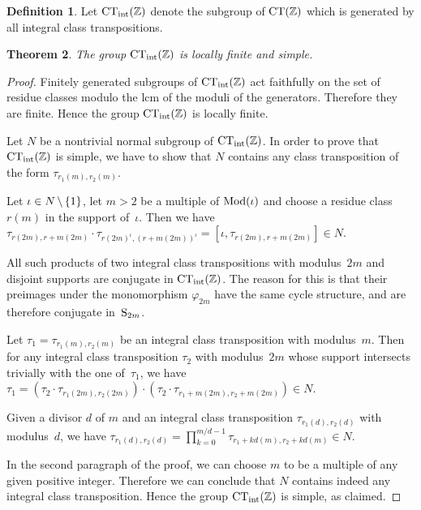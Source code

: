 \documentclass{amsart}
\theoremstyle{definition} \newtheorem{CTZDefinition}{Definition}[section]
\theoremstyle{plain}      \newtheorem{CTZPropertiesTheorem}[CTZDefinition]{Theorem}
\theoremstyle{plain}      \newtheorem{CTZSubgroupsTheorem}[CTZDefinition]{Theorem}
\theoremstyle{definition} \newtheorem{RcwaMappingDefinition}{Definition}[section]
\theoremstyle{definition} \newtheorem{RCWADefinition}[RcwaMappingDefinition]{Definition}
\theoremstyle{plain}      \newtheorem{CTZNotFinitelyGeneratedTheorem}
\theoremstyle{definition} \newtheorem{CTZSmEmbeddingDefinition}[RcwaMappingDefinition]{Definition}
\theoremstyle{plain}      \newtheorem{CTZHighlyTransitiveTheorem}[RcwaMappingDefinition]{Theorem}
\theoremstyle{plain}      \newtheorem{CTZTorsionElementsDivisibleTheorem}
\theoremstyle{plain}      \newtheorem{CTLemma}{Lemma}[section]
\theoremstyle{plain}      \newtheorem{IntegralCommutatorLemma}[CTLemma]{Lemma}
\theoremstyle{plain}      \newtheorem{NormalSubgroupContainsIntegralElementLemma}[CTLemma]{Lemma}
\theoremstyle{plain}      \newtheorem{CTZSimpleTheorem}[CTLemma]{Theorem}
\theoremstyle{remark}     \newtheorem{CTZSimpleRemark}[CTLemma]{Remark}
\theoremstyle{definition} \newtheorem{CTPZDefinition}[CTLemma]{Definition}
\theoremstyle{plain}      \newtheorem{CTPZSimpleCorollary}[CTLemma]{Corollary}
\theoremstyle{plain}      \newtheorem{CTPZSimpleProblem}[CTLemma]{Problem}
\theoremstyle{plain}      \newtheorem{FnPSL2ZEmbeddingTheorem}{Theorem}[section]
\theoremstyle{plain}      \newtheorem{FreeProductEmbeddingTheorem}[FnPSL2ZEmbeddingTheorem]{Theorem}
\theoremstyle{definition} \newtheorem{RestrictionMonomorphismDefinition}
\theoremstyle{plain}      \newtheorem{DirectAndWreathProductsEmbeddingTheorem}
\theoremstyle{plain}      \newtheorem{DirectAndWreathProductsEmbeddingCorollary}
\theoremstyle{definition} \newtheorem{CTintZDefinition}[FnPSL2ZEmbeddingTheorem]{Definition}
\theoremstyle{plain}      \newtheorem{CTintZSimpleTheorem}[FnPSL2ZEmbeddingTheorem]{Theorem}
\theoremstyle{definition} \newtheorem{KernelDefinition}{Definition}[section]
\theoremstyle{definition} \newtheorem{TameWildDefinition}[KernelDefinition]{Definition}
\theoremstyle{definition} \newtheorem{SimpleSupergroupsDefinition}[KernelDefinition]{Definition}
\theoremstyle{definition} \newtheorem{CSCRDefinition}[KernelDefinition]{Definition}
\theoremstyle{plain}      \newtheorem{SimpleSupergroupsGeneratorsTheorem}[KernelDefinition]{Theorem}
\theoremstyle{plain}      \newtheorem{SimpleSupergroupsTheorem}[KernelDefinition]{Theorem}
\theoremstyle{plain}      \newtheorem{SimpleSupergroupsTransitivityTheorem}
\theoremstyle{plain}      \newtheorem{TameGenerationConjecture}[KernelDefinition]{Conjecture}
\theoremstyle{remark}     \newtheorem{TameGenerationRemark}[KernelDefinition]{Remark}
\begin{document}
\begin{CTintZDefinition} \label{CTintZDefinition}
  Let \(\CTint{\ZZ}\) denote the subgroup of \(\CT{\ZZ}\) which is gene\-rated by all integral
  class transpositions.
\end{CTintZDefinition}

\begin{CTintZSimpleTheorem} \label{CTintZSimpleTheorem}
  The group \(\CTint{\ZZ}\) is locally finite and simple.
\end{CTintZSimpleTheorem}
\begin{proof}
  Finitely generated subgroups of \(\CTint{\ZZ}\) act faithfully on the set of residue
  classes modulo the lcm of the moduli of the generators. Therefore they are finite.
  Hence the group \(\CTint{\ZZ}\) is locally finite.

  Let \(N\) be a nontrivial normal subgroup of \(\CTint{\ZZ}\).
  In order to prove that \(\CTint{\ZZ}\) is simple, we have to show that \(N\) contains
  any class transposition of the form \(\tau_{r_1(m),r_2(m)}\).

  Let \(\iota \in N\hspace{-0.2mm}\setminus\hspace{-0.2mm}\{1\}\), let \(m\!>\!2\) be
  a multiple of \(\Mod{\iota}\) and choose a residue class \(r(m)\) in the support of~\(\iota\).
  Then we have \(\tau_{r(2m),r+m(2m)} \cdot \tau_{r(2m)^{\iota},(r+m(2m))^{\iota}} \! =
  [\iota,\tau_{r(2m),r+m(2m)}] \in \! N\).

  All such products of two integral class transpositions with modulus~\(2m\) and disjoint
  supports are conjugate in \(\CTint{\ZZ}\). The reason for this is that their preimages under
  the monomorphism \(\varphi_{2m}\) have the same cycle structure, and are therefore conjugate
  in~\(\Sym{2m}\).

  Let \(\tau_1 = \tau_{r_1(m),r_2(m)}\) be an integral class transposition with modulus~\(m\).
  Then for any integral class transposition \(\tau_2\) with modulus~\(2m\) whose support intersects
  trivially with the one of~\(\tau_1\), we have \(\tau_1 = (\tau_2 \cdot \tau_{r_1(2m),r_2(2m)})
  \cdot (\tau_2 \cdot \tau_{r_1+m(2m),r_2+m(2m)}) \in N\).

  Given a divisor \(d\) of \(m\) and an integral class transposition \(\tau_{r_1(d),r_2(d)}\) with
  modulus~\(d\), we have \(\tau_{r_1(d),r_2(d)} = \prod_{k=0}^{m/d-1} \tau_{r_1+kd(m),r_2+kd(m)}
  \in N\).

  In the second paragraph of the proof, we can choose \(m\) to be a multiple of any given
  positive integer. Therefore we can conclude that \(N\) contains indeed any integral class
  transposition. Hence the group \(\CTint{\ZZ}\) is simple, as claimed. 
\end{proof}
\end{document}
